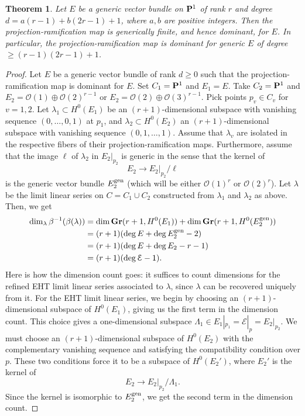 \documentclass[11pt,reqno]{amsart}
\theoremstyle{plain}
\newtheorem{theorem}{Theorem}[section]
\theoremstyle{definition}
\theoremstyle{remark}
\numberwithin{equation}{section}
\renewcommand{\to}{{\longrightarrow}}
\numberwithin{equation}{section}
\renewcommand{\O}{\mathcal O}
\begin{document}
\begin{theorem}\label{thm:prp1}
  Let $E$ be a generic vector bundle on $\P^1$ of rank $r$ and degree $d = a(r-1) + b(2r-1)+1$, where $a, b$ are positive integers.
  Then the projection-ramification map is generically finite, and hence dominant, for $E$.
  In particular, the projection-ramification map is dominant for generic $E$ of degree $\geq (r-1)(2r-1)+1$.
\end{theorem}
\begin{proof}
  Let $E$ be a generic vector bundle of rank $d \geq 0$ such that the projection-ramification map is dominant for $E$.
  Set $C_1 = \P^1$ and $E_1 = E$.
  Take $C_2 = \P^1$ and $E_2 = \O(1)\oplus\O(2)^{r-1}$ or $E_2 = \O(2) \oplus \O(3)^{r-1}$.
  Pick points $p_v \in C_v$ for $v = 1, 2$.
  Let $\lambda_1 \subset H^0(E_1)$ be an $(r+1)$-dimensional subspace with vanishing sequence $(0, \dots, 0, 1)$ at $p_1$, and $\lambda_2 \subset H^0(E_2)$ an $(r+1)$-dimensional subspace with vanishing sequence $(0, 1, \dots, 1)$.
  Assume that $\lambda_v$ are isolated in the respective fibers of their projection-ramification maps.
  Furthermore, assume that the image $\ell$ of $\lambda_2$ in $E_2|_{p_2}$ is generic in the sense that the kernel of
  \[ E_2 \to E_2|_{p_2}/ \ell \]
  is the generic vector bundle $E_2^{\rm gen}$ (which will be either $\O(1)^r$ or $\O(2)^r$).
  Let $\lambda$ be the limit linear series on $C = C_1 \cup C_2$ constructed from $\lambda_1$ and $\lambda_2$ as above.
  Then, we get
  \begin{align*}
    \dim_\lambda \beta^{-1}(\beta(\lambda)) &= \dim \Gr(r+1, H^0(E_1)) + \dim \Gr(r+1, H^0(E_2^{\rm gen}))\\
                                            &= (r+1)(\deg E + \deg E_2^{\rm gen}-2) \\
                                            &= (r+1)(\deg E + \deg E_2 - r - 1) \\
                                            &= (r+1)(\deg \mathcal E - 1).
  \end{align*}
  Here is how the dimension count goes: it suffices to count dimensions for the refined EHT limit linear series associated to $\lambda$, since $\lambda$ can be recovered uniquely from it.
  For the EHT limit linear series, we begin by choosing an $(r+1)$-dimensional subspace of $H^0(E_1)$, giving us the first term in the dimension count.
  This choice gives a one-dimensional subspace $\Lambda_1 \in E_1|_{p_1} = \mathcal E|_p = E_2|_{p_2}$.
  We must choose an $(r+1)$-dimensional subspace of $H^0(E_2)$ with the complementary vanishing sequence and satisfying the compatibility condition over $p$.
  These two conditions force it to be a subspace of $H^0(E_2')$, where $E_2'$ is the kernel of
  \[E_2 \to E_2|_{p_2}/\Lambda_1.\]
  Since the kernel is isomorphic to $E_2^{\rm gen}$, we get the second term in the dimension count.
  

\end{proof}
\end{document}
